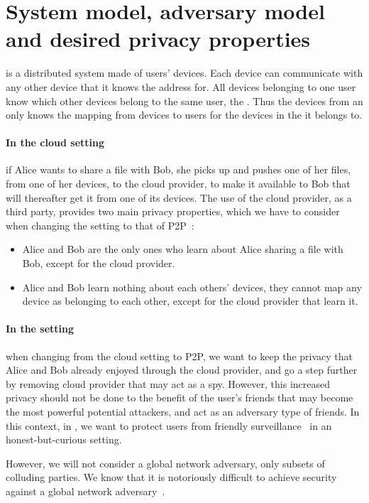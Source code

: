 \section{System model, adversary model and desired privacy properties}%
\label{system-model}

\name is a distributed system made of users' devices. 
Each device can communicate with any other device that it knows the
address for. All devices belonging to one user
 know which other devices belong to the same user, \ie the \squad.
Thus the devices from an \squad only knows the mapping from devices to users for the devices in 
the \squad it belongs to.

\paragraph*{In the cloud setting} if Alice wants to share a file with
Bob, she picks up and pushes one of her files, from one of her devices, to the cloud
provider, to make it available to Bob that will thereafter get it from
one of its devices. The use of the cloud provider, as a third party,
provides two main privacy properties, which we have to consider when
changing the setting to that of \ac{P2P}~\cite{DevilInMetadata}:
\begin{itemize}
\item Alice and Bob are the only ones who learn 
about Alice sharing a file with Bob, except for the cloud provider.
\item Alice and Bob learn nothing about each others' devices, \ie 
they cannot map any device as belonging to each other, except for the
cloud provider that learn it.
\end{itemize} 

\paragraph*{In the \name setting} when changing from the cloud setting
to \ac{P2P}, we want to keep the privacy that Alice and Bob already
enjoyed through the cloud provider, and go a step further by removing 
cloud provider that may act as a spy. However, this increased privacy
should not be done to the benefit of the user's friends that may
become the most powerful potential attackers, and act
as an adversary type of friends.
In this context, in \name, we want to protect users from friendly
surveillance~\cite{FriendlySurveillance} in an honest-but-curious setting.

However, we will not consider a global network adversary, only subsets of colluding 
parties. We know that it is notoriously difficult to achieve security against a global 
network adversary~\cite{SystemsForAnonymousCommunication}.
